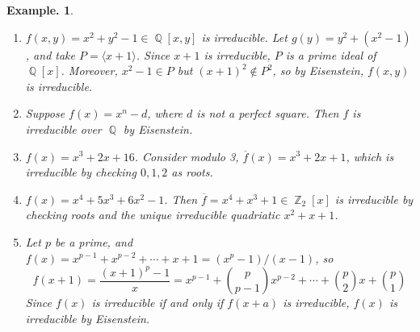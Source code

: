 \documentclass[11pt, a4paper]{memoir}
\DeclareMathOperator{\Q}{{\mathbb{Q}}}
\DeclareMathOperator{\Z}{{\mathbb{Z}}}
\theoremstyle{change}
\theoremstyle{plain}
\theoremstyle{nonumberplain}
\newtheorem{example}{Example.}
\numberwithin{equation}{section}
\begin{document}
\begin{example}
    \begin{enumerate}
        \item $f(x,y)=x^2+y^2-1\in \Q[x,y]$ is irreducible.
            Let $g(y)=y^2+(x^2-1)$, and take $P=\langle x+1\rangle$.
            Since $x+1$ is irreducible, $P$ is a prime ideal of $\Q[x]$.
            Moreover, $x^2-1\in P$ but $(x+1)^2\notin P^2$, so by Eisenstein, $f(x,y)$ is irreducible.
        \item Suppose $f(x)=x^n-d$, where $d$ is not a perfect square.
            Then $f$ is irreducible over $\Q$ by Eisenstein.
        \item $f(x)=x^3+2x+16$.
            Consider modulo 3, $\overline{f}(x)=x^3+2x+1$, which is irreducible by checking $0,1,2$ as roots.
        \item $f(x)=x^4+5x^3+6x^2-1$.
            Then $\overline{f}=x^4+x^3+1\in\Z_2[x]$ is irreducible by checking roots and the unique irreducible quadriatic $x^2+x+1$.
        \item Let $p$ be a prime, and $f(x)=x^{p-1}+x^{p-2}+\cdots+x+1=(x^p-1)/(x-1)$, so
            \begin{equation*}
                f(x+1)=\frac{(x+1)^p-1}{x}=x^{p-1}+\binom{p}{p-1}x^{p-2}+\cdots+\binom{p}{2}x+\binom{p}{1}
            \end{equation*}
            Since $f(x)$ is irreducible if and only if $f(x+a)$ is irreducible, $f(x)$ is irreducible by Eisenstein.
\end{enumerate}
\end{example}
\end{document}
